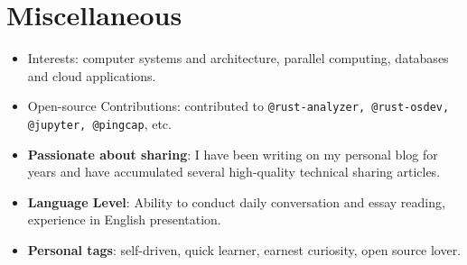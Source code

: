 \documentclass{resume}
\newcommand{\en}[1]{#1}
\newcommand{\zh}[1]{}
\begin{document}
\section{\en{Miscellaneous}\zh{其他}}
\begin{itemize}
      \item \en{Interests: computer systems and architecture, parallel computing, databases and cloud applications.}
            \zh{兴趣：分布式系统、存储、数据库、云计算应用等。}
      \item \en{Open-source Contributions: contributed to \texttt{@rust-analyzer, @rust-osdev, @jupyter, @pingcap}, etc.}
            \zh{开源贡献: 为 \texttt{@rust-analyzer, @rust-osdev, @jupyter, @pingcap} 等组织贡献过代码。}
      \item \en{\textbf{Passionate about sharing}: I have been writing on my personal blog for years and have accumulated several high-quality technical sharing articles.}
            \zh{\textbf{热爱分享}: 在个人博客上常年坚持写作，积累高质量技术分享文章数篇}
       \item \en{\textbf{Language Level}: Ability to conduct daily conversation and essay reading, experience in English presentation.}
            \zh{\textbf{语言水平}：能够进行日常对话和论文阅读，有英文演讲经验}
       \item \en{\textbf{Personal tags}: self-driven, quick learner, earnest curiosity, open source lover.}
            \zh{\textbf{个人标签}：自驱动，学习能力强，做事认真，保持好奇，热爱开源}
\end{itemize}
\end{document}

